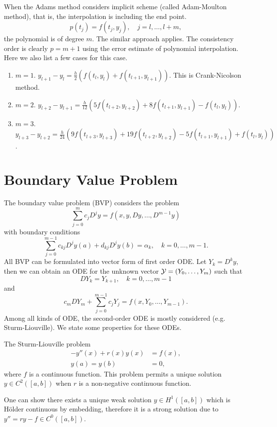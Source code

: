 When the Adams method considers implicit scheme (called Adam-Moulton method), that is, the interpolation is including the end point.
\begin{equation}
    p(t_j) = f(t_j, y_{j}),\quad j = l, \dots, l+m,
\end{equation}
the polynomial is of degree $m$. The similar approach applies. The consistency order is clearly $p = m+1$ using the error estimate of polynomial interpolation. Here we also list a few cases for this case. 
\begin{enumerate}
    \item $m=1$. $y_{l+1} - y_{l} = \frac{h}{2}( f(t_l, y_l)  + f(t_{l+1}, y_{l+1}))$. This is Crank-Nicolson method. 
    \item $m=2$. $y_{l+2} - y_{l+1} = \frac{h}{12}(5 f(t_{l+2}, y_{l+2}) + 8 f(t_{l+1}, y_{l+1}) - f(t_l, y_l))$.
    \item $m=3$. $y_{l+3} - y_{l+2} = \frac{h}{24} (9 f(t_{l+3}, y_{l+3}) + 19 f(t_{l+2}, y_{l+2}) - 5 f(t_{l+1}, y_{l+1}) +  f(t_l, y_l))$. 
\end{enumerate}
\section{Boundary Value Problem}
The boundary value problem (BVP) considers the problem
\begin{equation}
    \sum_{j = 0}^m c_j D^j y = f(x, y, Dy, \dots, D^{m-1} y)
\end{equation}
with boundary conditions 
$$\sum_{j=0}^{m-1} c_{kj} D^j y (a) + d_{kj} D^j y(b) = \alpha_k,\quad k = 0,\dots, m-1.$$
All BVP can be formulated into vector form of first order ODE. Let $Y_k = D^k y$, then we can obtain an ODE for the unknown vector $\mathcal Y = (Y_0, \dots, Y_m)$ such that 
\begin{equation}
    D Y_k = Y_{k+1},\quad k = 0, \dots, m-1
\end{equation}
and 
\begin{equation}
   c_m  D Y_m + \sum_{j=0}^{m-1} c_j Y_j = f(x, Y_0,\dots, Y_{m-1}).
\end{equation}
Among all kinds of ODE, the second-order ODE is mostly considered (e.g. Sturm-Liouville). We state some properties for these ODEs. 
\begin{theorem}
    The Sturm-Liouville problem 
    \begin{equation}
        \begin{aligned}
            -y''(x) + r(x) y(x) &= f(x), \\ 
            y(a) = y(b ) &= 0,
        \end{aligned}
    \end{equation}
    where $f$ is a continuous function. This problem permits a unique solution $y\in C^2([a, b])$ when $r$ is a non-negative continuous function.
\end{theorem}
\begin{remark}
    One can show there exists a unique weak solution $y\in H^1([a, b])$ which is H\"older continuous by embedding, therefore it is a strong solution due to $y'' = r y -f\in C^0([a, b])$.
\end{remark} 
